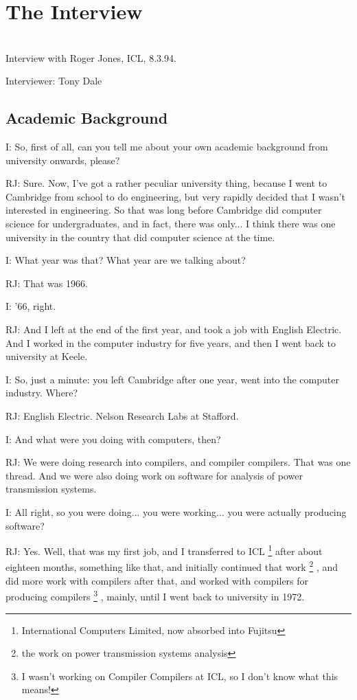 \documentclass[10pt,titlepage]{book}
\begin{document}
\section{The Interview}

\ \\

Interview with Roger Jones, ICL, 8.3.94.

Interviewer: Tony Dale 

\subsection{Academic Background} 

I: So, first of all, can you tell me about your own academic background from university onwards, please?

RJ: Sure. Now, I've got a rather peculiar university thing, because I went to Cambridge from school to do engineering, but very rapidly decided that I wasn't interested in engineering. So that was long before Cambridge did computer science for undergraduates, and in fact, there was only... I think there was one university in the country that did computer science at the time.

I: What year was that? What year are we talking about?

RJ: That was 1966.

I: '66, right.

RJ: And I left at the end of the first year, and took a job with English Electric. And I worked in the computer industry for five years, and then I went back to university at Keele.

I: So, just a minute: you left Cambridge after one year, went into the computer industry. Where?

RJ: English Electric. Nelson Research Labs at Stafford.

I: And what were you doing with computers, then?

RJ: We were doing research into compilers, and compiler compilers. That was one thread. And we were also doing work on software for analysis of power transmission systems.

I: All right, so you were doing... you were working... you were actually producing software?

RJ: Yes. Well, that was my first job, and I transferred to ICL%
\footnote{
International Computers Limited, now absorbed into Fujitsu}%
after about eighteen months, something like that, and initially continued that work%
\footnote{
the work on power transmission systems analysis}%
, and did more work with compilers after that, and worked with compilers for producing compilers%
\footnote{
I wasn't working on Compiler Compilers at ICL, so I don't know what this means!}%
, mainly, until I went back to university in 1972.
\end{document}
